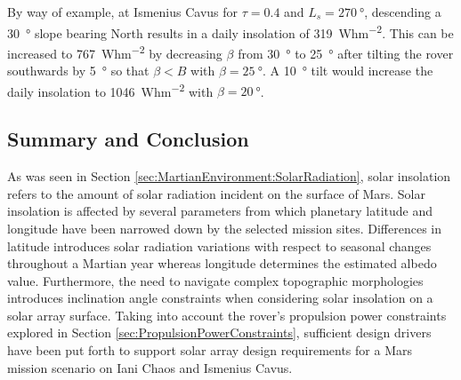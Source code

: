 
By way of example, at Ismenius Cavus for $\tau = 0.4$ and $L_{s}=\SI{270}{\degree}$, descending a \SI{30}{\degree} slope bearing North results in a daily insolation of \SI{319}{Whm^{-2}}. This can be increased to \SI{767}{Whm^{-2}} by decreasing $\beta$ from \SI{30}{\degree} to \SI{25}{\degree} after tilting the rover southwards by \SI{5}{\degree} so that $\beta < B$ with $\beta = \SI{25}{\degree}$. A \SI{10}{\degree} tilt would increase the daily insolation to \SI{1046}{Whm^{-2}} with $\beta = \SI{20}{\degree}$.


\subsection{Summary and Conclusion}
As was seen in Section \ref{sec:MartianEnvironment:SolarRadiation}, solar insolation refers to the amount of solar radiation incident on the surface of Mars. Solar insolation is affected by several parameters from which planetary latitude and longitude have been narrowed down by the selected mission sites. Differences in latitude introduces solar radiation variations with respect to seasonal changes throughout a Martian year whereas longitude determines the estimated albedo value. Furthermore, the need to navigate complex topographic morphologies introduces inclination angle constraints when considering solar insolation on a solar array surface. Taking into account the rover's propulsion power constraints explored in Section \ref{sec:PropulsionPowerConstraints}, sufficient design drivers have been put forth to support solar array design requirements for a Mars mission scenario on Iani Chaos and Ismenius Cavus.
